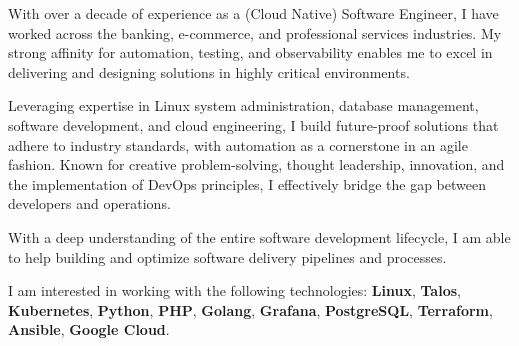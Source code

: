 
\begin{cvparagraph}
With over a decade of experience as a (Cloud Native) Software Engineer, I have worked across the banking, e-commerce, and professional services industries.
My strong affinity for automation, testing, and observability enables me to excel in delivering and designing solutions in highly critical environments.

Leveraging expertise in Linux system administration, database management, software development, and cloud engineering, 
I build future-proof solutions that adhere to industry standards, with automation as a cornerstone in an agile fashion.
Known for creative problem-solving, thought leadership, innovation, and the implementation of DevOps principles, I effectively bridge the gap between developers and operations.

With a deep understanding of the entire software development lifecycle, I am able to help building and optimize software delivery pipelines and processes.

I am interested in working with the following technologies: \textbf{Linux}, \textbf{Talos}, \textbf{Kubernetes}, \textbf{Python}, \textbf{PHP}, \textbf{Golang}, \textbf{Grafana}, \textbf{PostgreSQL}, \textbf{Terraform}, \textbf{Ansible}, \textbf{Google Cloud}.


\end{cvparagraph}

